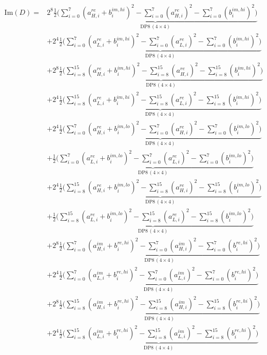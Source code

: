 \documentclass[fleqn]{article}
\newcommand{\DPop}[3]{\mathrm{DP#1}\,(#2\!\times\!#3)}
\begin{document}
\begin{align*}
\mathrm{Im}(D) = {}
  & 2^{8}\underbrace{\tfrac{1}{2}\Big(\sum_{i=0}^{7}(a_{H,i}^{re}{+}b_i^{im,hi})^2 - \sum_{i=0}^{7}(a_{H,i}^{re})^2 - \sum_{i=0}^{7}(b_i^{im,hi})^2\Big)}_{\DPop{8}{4}{4}} \\[0.7em]
  & + 2^{4}\underbrace{\tfrac{1}{2}\Big(\sum_{i=0}^{7}(a_{L,i}^{re}{+}b_i^{im,hi})^2 - \sum_{i=0}^{7}(a_{L,i}^{re})^2 - \sum_{i=0}^{7}(b_i^{im,hi})^2\Big)}_{\DPop{8}{4}{4}} \\[0.7em]
  & + 2^{8}\underbrace{\tfrac{1}{2}\Big(\sum_{i=8}^{15}(a_{H,i}^{re}{+}b_i^{im,hi})^2 - \sum_{i=8}^{15}(a_{H,i}^{re})^2 - \sum_{i=8}^{15}(b_i^{im,hi})^2\Big)}_{\DPop{8}{4}{4}} \\[0.7em]
  & + 2^{4}\underbrace{\tfrac{1}{2}\Big(\sum_{i=8}^{15}(a_{L,i}^{re}{+}b_i^{im,hi})^2 - \sum_{i=8}^{15}(a_{L,i}^{re})^2 - \sum_{i=8}^{15}(b_i^{im,hi})^2\Big)}_{\DPop{8}{4}{4}} \\[0.7em]
  & + 2^{4}\underbrace{\tfrac{1}{2}\Big(\sum_{i=0}^{7}(a_{H,i}^{re}{+}b_i^{im,lo})^2 - \sum_{i=0}^{7}(a_{H,i}^{re})^2 - \sum_{i=0}^{7}(b_i^{im,lo})^2\Big)}_{\DPop{8}{4}{4}} \\[0.7em]
  & + \underbrace{\tfrac{1}{2}\Big(\sum_{i=0}^{7}(a_{L,i}^{re}{+}b_i^{im,lo})^2 - \sum_{i=0}^{7}(a_{L,i}^{re})^2 - \sum_{i=0}^{7}(b_i^{im,lo})^2\Big)}_{\DPop{8}{4}{4}} \\[0.7em]
  & + 2^{4}\underbrace{\tfrac{1}{2}\Big(\sum_{i=8}^{15}(a_{H,i}^{re}{+}b_i^{im,lo})^2 - \sum_{i=8}^{15}(a_{H,i}^{re})^2 - \sum_{i=8}^{15}(b_i^{im,lo})^2\Big)}_{\DPop{8}{4}{4}} \\[0.7em]
  & + \underbrace{\tfrac{1}{2}\Big(\sum_{i=8}^{15}(a_{L,i}^{re}{+}b_i^{im,lo})^2 - \sum_{i=8}^{15}(a_{L,i}^{re})^2 - \sum_{i=8}^{15}(b_i^{im,lo})^2\Big)}_{\DPop{8}{4}{4}} \\[0.7em]
  & + 2^{8}\underbrace{\tfrac{1}{2}\Big(\sum_{i=0}^{7}(a_{H,i}^{im}{+}b_i^{re,hi})^2 - \sum_{i=0}^{7}(a_{H,i}^{im})^2 - \sum_{i=0}^{7}(b_i^{re,hi})^2\Big)}_{\DPop{8}{4}{4}} \\[0.7em]
  & + 2^{4}\underbrace{\tfrac{1}{2}\Big(\sum_{i=0}^{7}(a_{L,i}^{im}{+}b_i^{re,hi})^2 - \sum_{i=0}^{7}(a_{L,i}^{im})^2 - \sum_{i=0}^{7}(b_i^{re,hi})^2\Big)}_{\DPop{8}{4}{4}} \\[0.7em]
  & + 2^{8}\underbrace{\tfrac{1}{2}\Big(\sum_{i=8}^{15}(a_{H,i}^{im}{+}b_i^{re,hi})^2 - \sum_{i=8}^{15}(a_{H,i}^{im})^2 - \sum_{i=8}^{15}(b_i^{re,hi})^2\Big)}_{\DPop{8}{4}{4}} \\[0.7em]
  & + 2^{4}\underbrace{\tfrac{1}{2}\Big(\sum_{i=8}^{15}(a_{L,i}^{im}{+}b_i^{re,hi})^2 - \sum_{i=8}^{15}(a_{L,i}^{im})^2 - \sum_{i=8}^{15}(b_i^{re,hi})^2\Big)}_{\DPop{8}{4}{4}} \\[0.7em]

\end{align*}
\end{document}
